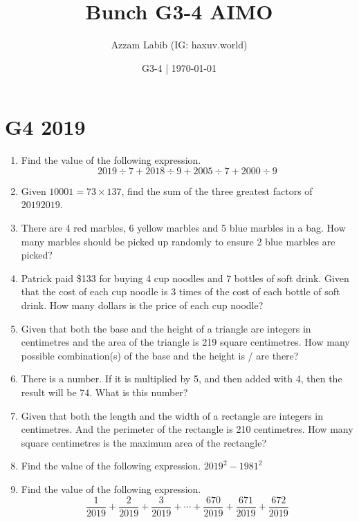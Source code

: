 \documentclass[11pt]{scrartcl}
\title{Bunch G3-4 AIMO}
\author{Azzam Labib (IG: haxuv.world)}
\date{G3-4 | \today}
\begin{document}
\maketitle

\section{G4 2019}
\begin{enumerate}
    \item Find the value of the following expression.
    \[2019 \div 7 + 2018 \div 9 + 2005 \div 7 + 2000 \div 9\]
    
    \item Given $10001 = 73 \times 137$, find the sum of the three greatest factors of $20192019$.
    
    \item There are 4 red marbles, 6 yellow marbles and 5 blue marbles in a bag. How many marbles should be picked up randomly to ensure 2 blue marbles are picked?
    
    \item Patrick paid \$133 for buying 4 cup noodles and 7 bottles of soft drink. Given that the cost of each cup noodle is 3 times of the cost of each bottle of soft drink. How many dollars is the price of each cup noodle?
    
    \item Given that both the base and the height of a triangle are integers in centimetres and the area of the triangle is 219 square centimetres. How many possible combination(s) of the base and the height is / are there?
    
    \item There is a number. If it is multiplied by 5, and then added with 4, then the result will be 74. What is this number?
    
    \item Given that both the length and the width of a rectangle are integers in centimetres. And the perimeter of the rectangle is 210 centimetres. How many square centimetres is the maximum area of the rectangle?
    
    \item Find the value of the following expression.
    $2019^2-1981^2$
    
    \item Find the value of the following expression.
    \[\frac{1}{2019} + \frac{2}{2019} + \frac{3}{2019} + \cdots + \frac{670}{2019} + \frac{671}{2019} + \frac{672}{2019}\]
    

\end{enumerate}
\end{document}
